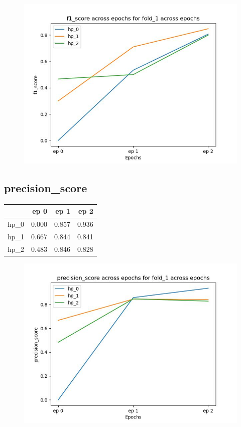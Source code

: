 \documentclass{article}
\begin{document}
\begin{figure}[H]
\includegraphics[scale = 0.75]{fold_1/f1_score}
\end{figure}
\subsection{precision\_score}
\begin{tabular}{lrrr}
\toprule
{} &   ep 0 &   ep 1 &   ep 2 \\
\midrule
hp\_0 &  0.000 &  0.857 &  0.936 \\
hp\_1 &  0.667 &  0.844 &  0.841 \\
hp\_2 &  0.483 &  0.846 &  0.828 \\
\bottomrule
\end{tabular}

\begin{figure}[H]
\includegraphics[scale = 0.75]{fold_1/precision_score}
\end{figure}
\end{document}
